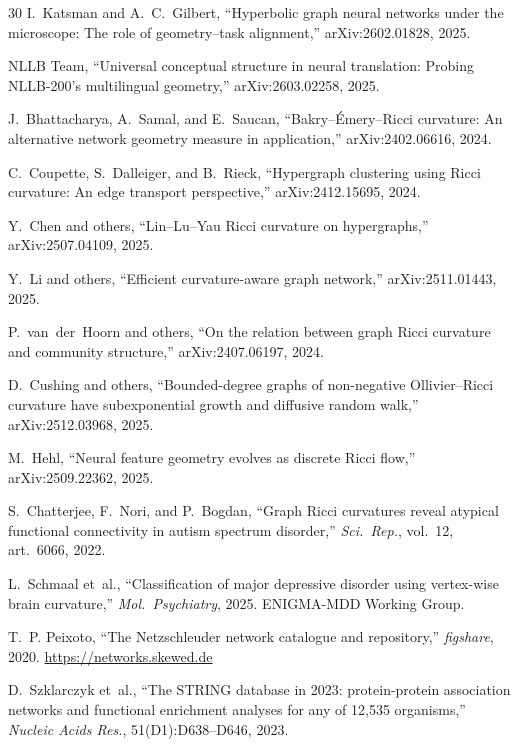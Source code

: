 \documentclass[11pt,a4paper]{article}
\begin{document}
\begin{thebibliography}{30}
I.~Katsman and A.~C.~Gilbert,
``Hyperbolic graph neural networks under the microscope: The role of geometry--task alignment,''
arXiv:2602.01828, 2025.

NLLB Team,
``Universal conceptual structure in neural translation: Probing NLLB-200's multilingual geometry,''
arXiv:2603.02258, 2025.

J.~Bhattacharya, A.~Samal, and E.~Saucan,
``Bakry--\'Emery--Ricci curvature: An alternative network geometry measure in application,''
arXiv:2402.06616, 2024.

C.~Coupette, S.~Dalleiger, and B.~Rieck,
``Hypergraph clustering using Ricci curvature: An edge transport perspective,''
arXiv:2412.15695, 2024.

Y.~Chen and others,
``Lin--Lu--Yau Ricci curvature on hypergraphs,''
arXiv:2507.04109, 2025.

Y.~Li and others,
``Efficient curvature-aware graph network,''
arXiv:2511.01443, 2025.

P.~van~der~Hoorn and others,
``On the relation between graph Ricci curvature and community structure,''
arXiv:2407.06197, 2024.

D.~Cushing and others,
``Bounded-degree graphs of non-negative Ollivier--Ricci curvature have subexponential growth and diffusive random walk,''
arXiv:2512.03968, 2025.

M.~Hehl,
``Neural feature geometry evolves as discrete Ricci flow,''
arXiv:2509.22362, 2025.

S.~Chatterjee, F.~Nori, and P.~Bogdan,
``Graph Ricci curvatures reveal atypical functional connectivity in autism spectrum disorder,''
\emph{Sci.~Rep.}, vol.~12, art.~6066, 2022.

L.~Schmaal et~al.,
``Classification of major depressive disorder using vertex-wise brain curvature,''
\emph{Mol.~Psychiatry}, 2025. ENIGMA-MDD Working Group.

T.~P. Peixoto,
``The Netzschleuder network catalogue and repository,''
\emph{figshare}, 2020. \url{https://networks.skewed.de}

D.~Szklarczyk et~al.,
``The STRING database in 2023: protein-protein association networks and functional enrichment analyses for any of 12{,}535 organisms,''
\emph{Nucleic Acids Res.}, 51(D1):D638--D646, 2023.


\end{thebibliography}
\end{document}
